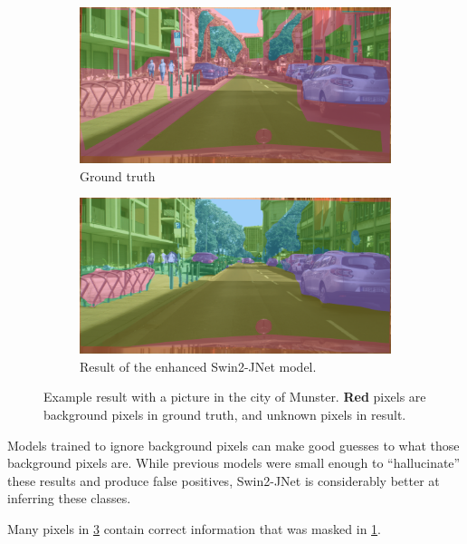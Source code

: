 \begin{figure}[h]
	\begin{subfigure}{.5\textwidth}
		\includegraphics[width=\textwidth]{city_images/swin2_no_background_gt_pic.png}
		\caption{Ground truth}
		\label{swin2_gt_image}
	\end{subfigure}
	\begin{subfigure}{.5\textwidth}
		\includegraphics[width=\textwidth]{city_images/swin2_no_background_pic.png}
		\caption{Result of the enhanced Swin2-JNet model.}
		\label{swin2_result_image}
	\end{subfigure}
	\caption{Example result with a picture in the city of Munster. \textbf{\textcolor{BrickRed}{Red}} pixels are background pixels in ground truth, and unknown pixels in result.}
\end{figure}

Models trained to ignore background pixels can make good guesses to what those background pixels are.
While previous models were small enough to ``hallucinate'' these results and produce false positives, Swin2-JNet is considerably better at inferring these classes.

Many pixels in \cref{swin2_result_image} contain correct information that was masked in \cref{swin2_gt_image}.

